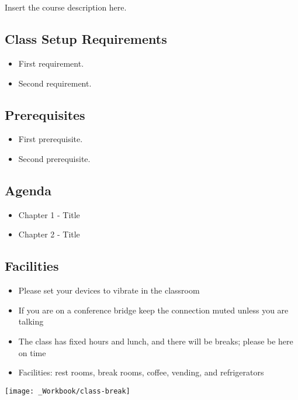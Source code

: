 \documentclass[../workbook]{subfiles}
\begin{document}

\section*{\bookcoursenumber{} \bookmajortitle}

Insert the course description here.



\subsection*{Class Setup Requirements}

\begin{itemize}
    \item First requirement.
    \item Second requirement.
\end{itemize}



\subsection*{Prerequisites}

\begin{itemize}
    \item First prerequisite.
    \item Second prerequisite.
\end{itemize}



\subsection*{Agenda}

\begin{itemize}
    \item Chapter 1 - Title
    \item Chapter 2 - Title
\end{itemize}



\subsection*{Facilities}

\begin{itemize}
    \item Please set your devices to vibrate in the classroom
    \item If you are on a conference bridge keep the connection muted unless you are talking
    \item The class has fixed hours and lunch, and there will be breaks; please be here on time
    \item Facilities: rest rooms, break rooms, coffee, vending, and refrigerators
\end{itemize}

\edef\measurepage{\the\dimexpr\pagegoal-\pagetotal-\baselineskip\relax}
\mbox{}\hfill\texttt{[image: \_Workbook/class-break]}
\end{document}
